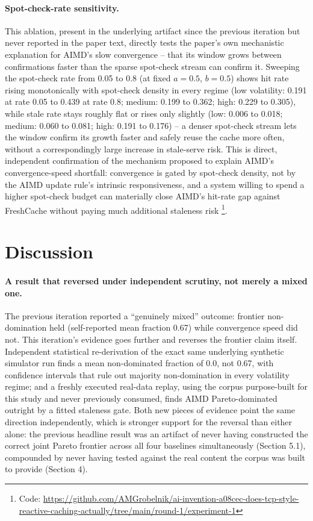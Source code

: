 \documentclass[11pt,letterpaper]{article}
\begin{document}
\paragraph{Spot-check-rate sensitivity.} This ablation, present in the underlying artifact since the previous
iteration but never reported in the paper text, directly tests the paper's own mechanistic explanation for
AIMD's slow convergence -- that its window grows between confirmations faster than the sparse spot-check
stream can confirm it. Sweeping the spot-check rate from 0.05 to 0.8 (at fixed $a=0.5$, $b=0.5$) shows
hit rate rising monotonically with spot-check density in every regime (low volatility: 0.191 at rate 0.05
to 0.439 at rate 0.8; medium: 0.199 to 0.362; high: 0.229 to 0.305), while stale rate stays roughly flat or
rises only slightly (low: 0.006 to 0.018; medium: 0.060 to 0.081; high: 0.191 to 0.176) -- a denser spot-check
stream lets the window confirm its growth faster and safely reuse the cache more often, without a
correspondingly large increase in stale-serve risk. This is direct, independent confirmation of the
mechanism proposed to explain AIMD's convergence-speed shortfall: convergence is gated by spot-check
density, not by the AIMD update rule's intrinsic responsiveness, and a system willing to spend a higher
spot-check budget can materially close AIMD's hit-rate gap against FreshCache without paying much
additional staleness risk \footnote{Code: \url{https://github.com/AMGrobelnik/ai-invention-a08cec-does-tcp-style-reactive-caching-actually/tree/main/round-1/experiment-1}}.

\section{Discussion}

\paragraph{A result that reversed under independent scrutiny, not merely a mixed one.} The previous iteration
reported a ``genuinely mixed'' outcome: frontier non-domination held (self-reported mean fraction 0.67) while
convergence speed did not. This iteration's evidence goes further and reverses the frontier claim itself.
Independent statistical re-derivation of the exact same underlying synthetic simulator run finds a mean
non-dominated fraction of 0.0, not 0.67, with confidence intervals that rule out majority non-domination in
every volatility regime; and a freshly executed real-data replay, using the corpus purpose-built for this
study and never previously consumed, finds AIMD Pareto-dominated outright by a fitted staleness gate.
Both new pieces of evidence point the same direction independently, which is stronger support for the
reversal than either alone: the previous headline result was an artifact of never having constructed the
correct joint Pareto frontier across all four baselines simultaneously (Section 5.1), compounded by never
having tested against the real content the corpus was built to provide (Section 4).
\end{document}
